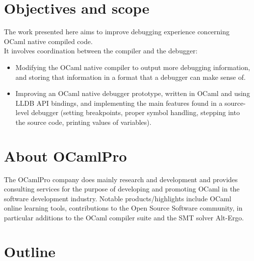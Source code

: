 \newpage

\section{Objectives and scope\label{sec:objective}}

The work presented here aims to improve debugging experience concerning OCaml
native compiled code. \\
It involves coordination between the compiler and the debugger:

\begin{itemize}
    \item Modifying the OCaml native compiler to output more debugging
        information,
        and storing that information in a format that a debugger can make
        sense of.
    \item  Improving an OCaml native debugger prototype, written in OCaml and using LLDB
        API bindings, and implementing the main features found in a source-level
        debugger (setting breakpoints, proper symbol handling, stepping into the source
        code, printing values of variables).
\end{itemize}

\section{About OCamlPro}

The OCamlPro company does mainly research and development and provides
consulting services for the purpose of developing and promoting OCaml in the
software development industry.
Notable products/highlights include OCaml online learning tools, contributions
to the Open Source Software community, in particular additions to the OCaml
compiler suite and the SMT solver Alt-Ergo.





\section{Outline\label{sec:outline}}

